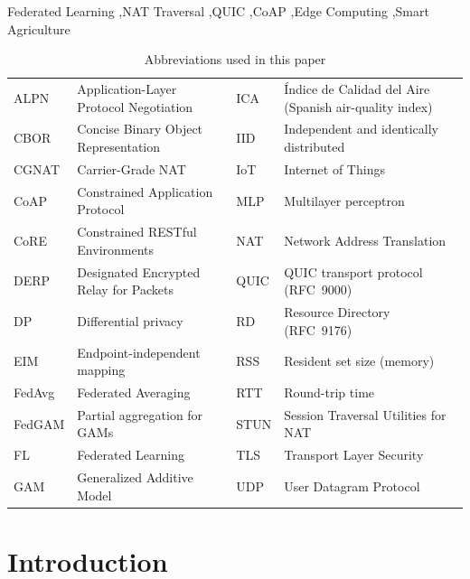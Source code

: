 \documentclass[a4paper,fleqn]{cas-dc}
\begin{document}
\begin{keywords}
Federated Learning \sep NAT Traversal \sep QUIC \sep CoAP \sep Edge Computing \sep Smart Agriculture
\end{keywords}

\maketitle

\begin{table}[!t]
\caption{Abbreviations used in this paper}
\label{tab:abbrev}
\scriptsize
\setlength{\tabcolsep}{3pt}
\begin{tabular}{@{}l p{2.9cm} l p{2.9cm}@{}}
\toprule
ALPN & Application-Layer Protocol Negotiation & ICA & \'Indice de Calidad del Aire (Spanish air-quality index) \\
CBOR & Concise Binary Object Representation & IID & Independent and identically distributed \\
CGNAT & Carrier-Grade NAT & IoT & Internet of Things \\
CoAP & Constrained Application Protocol & MLP & Multilayer perceptron \\
CoRE & Constrained RESTful Environments & NAT & Network Address Translation \\
DERP & Designated Encrypted Relay for Packets & QUIC & QUIC transport protocol (RFC~9000) \\
DP & Differential privacy & RD & Resource Directory (RFC~9176) \\
EIM & Endpoint-independent mapping & RSS & Resident set size (memory) \\
FedAvg & Federated Averaging & RTT & Round-trip time \\
FedGAM & Partial aggregation for GAMs & STUN & Session Traversal Utilities for NAT \\
FL & Federated Learning & TLS & Transport Layer Security \\
GAM & Generalized Additive Model & UDP & User Datagram Protocol \\
\bottomrule
\end{tabular}
\end{table}

\section{Introduction}
\label{sec:introduction}
\end{document}
